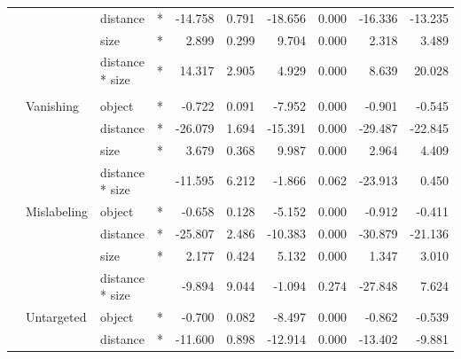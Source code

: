 \documentclass[
]{article}
\begin{document}
\begin{longtable}[t]{llllrrrrrr}
\cmidrule{3-10}\nopagebreak
\hspace{1em} &  & distance & * & -14.758 & 0.791 & -18.656 & 0.000 & -16.336 & -13.235\\
\cmidrule{3-10}\nopagebreak
\hspace{1em} &  & size & * & 2.899 & 0.299 & 9.704 & 0.000 & 2.318 & 3.489\\
\cmidrule{3-10}\nopagebreak
\hspace{1em} &  & distance * size & * & 14.317 & 2.905 & 4.929 & 0.000 & 8.639 & 20.028\\
\cmidrule{1-10}\pagebreak[0]
\addlinespace[0.3em]
\multicolumn{10}{l}{\textbf{RetinaNet}}\\
\hspace{1em} & Vanishing & object & * & -0.722 & 0.091 & -7.952 & 0.000 & -0.901 & -0.545\\
\cmidrule{3-10}\nopagebreak
\hspace{1em} &  & distance & * & -26.079 & 1.694 & -15.391 & 0.000 & -29.487 & -22.845\\
\cmidrule{3-10}\nopagebreak
\hspace{1em} &  & size & * & 3.679 & 0.368 & 9.987 & 0.000 & 2.964 & 4.409\\
\cmidrule{3-10}\nopagebreak
\hspace{1em} &  & distance * size &  & -11.595 & 6.212 & -1.866 & 0.062 & -23.913 & 0.450\\
\cmidrule{2-10}\nopagebreak
\hspace{1em} & Mislabeling & object & * & -0.658 & 0.128 & -5.152 & 0.000 & -0.912 & -0.411\\
\cmidrule{3-10}\nopagebreak
\hspace{1em} &  & distance & * & -25.807 & 2.486 & -10.383 & 0.000 & -30.879 & -21.136\\
\cmidrule{3-10}\nopagebreak
\hspace{1em} &  & size & * & 2.177 & 0.424 & 5.132 & 0.000 & 1.347 & 3.010\\
\cmidrule{3-10}\nopagebreak
\hspace{1em} &  & distance * size &  & -9.894 & 9.044 & -1.094 & 0.274 & -27.848 & 7.624\\
\cmidrule{2-10}\nopagebreak
\hspace{1em} & Untargeted & object & * & -0.700 & 0.082 & -8.497 & 0.000 & -0.862 & -0.539\\
\cmidrule{3-10}\nopagebreak
\hspace{1em} &  & distance & * & -11.600 & 0.898 & -12.914 & 0.000 & -13.402 & -9.881\\

\end{longtable}
\end{document}
